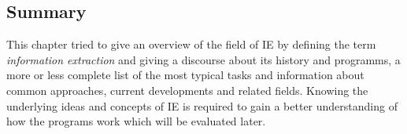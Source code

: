 \subsection{Summary}
This chapter tried to give an overview of the field of \gls{IE} by defining the term \textit{information extraction} and giving a discourse about its history and programms, a more or less complete list of the most typical tasks and information about common approaches, current developments and related fields. Knowing the underlying ideas and concepts of \gls{IE} is required to gain a better understanding of how the programs work which will be evaluated later.

